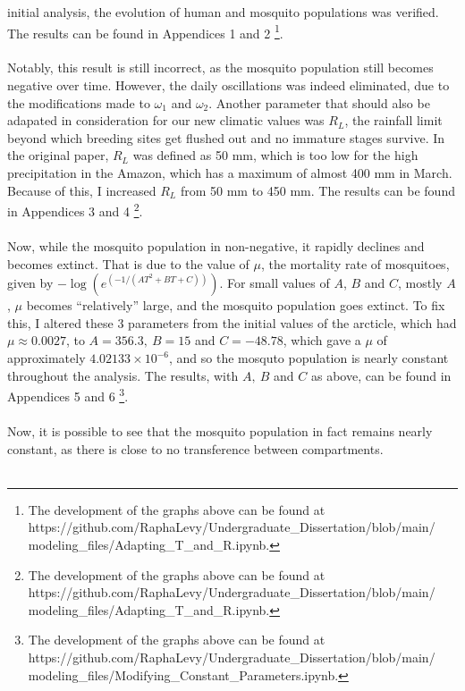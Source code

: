 initial analysis, the evolution of human and mosquito populations 
was verified.  
The results can be found in Appendices 1 and 2 
\footnote{The development of the graphs above can be found at 
https://github.com/RaphaLevy/Undergraduate\_Dissertation/blob/main/
\\modeling\_files/Adapting\_T\_and\_R.ipynb.}. 
\\\\
Notably, this result is still incorrect, as the mosquito population
still becomes negative over time. 
However, the daily oscillations
was indeed eliminated, due to the modifications made to $\omega_1$ and $\omega_2$.
Another parameter that should also be adapated in consideration for our new climatic
values was $R_L$, the rainfall limit beyond which breeding sites get flushed out and no 
immature stages survive. In the original paper, $R_L$ was defined as 50 mm, which is
too low for the high precipitation in the Amazon, which has a maximum of almost
400 mm in March. Because of this, I increased $R_L$ from 50 mm to 450 mm.
The results can be found in Appendices 3 and 4 
\footnote{The development of the graphs above can be found at 
https://github.com/RaphaLevy/Undergraduate\_Dissertation/blob/main/
\\modeling\_files/Adapting\_T\_and\_R.ipynb.}.
\\\\
Now, while the mosquito population in non-negative, it rapidly declines and
becomes extinct. That is due to the value of $\mu$, the mortality rate of mosquitoes,
given by $-\log(e^{(-1 / (AT^2 + BT + C))})$. For small values of 
$A$, $B$ and $C$, mostly $A$, $\mu$ becomes ``relatively'' large, and the mosquito
population goes extinct. To fix this, I altered these 3 parameters from the initial values 
of the arcticle, which had $\mu \approx 0.0027$, to $A=356.3, \ B=15$
and $C=-48.78$, which gave a $\mu$ of approximately $4.02133 \times 10^{-6}$, 
and so the mosquto population is nearly constant throughout the analysis.
The results, with $A, \ B$
and $C$ as above, can be found in Appendices 5 and 6 
\footnote{The development of the graphs above can be found at 
https://github.com/RaphaLevy/Undergraduate\_Dissertation/blob/main/
\\modeling\_files/Modifying\_Constant\_Parameters.ipynb.}.
\\\\
Now, it is possible to see that the mosquito population in fact remains nearly constant,
as there is close to no transference between compartments.
\\\\
